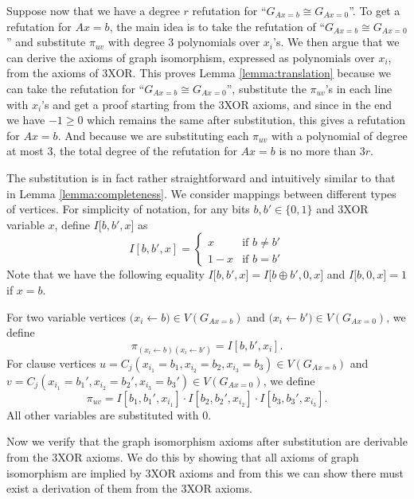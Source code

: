 \documentclass[a4paper,twoside,justified]{tufte-handout}
\begin{document}
Suppose now that we have a degree $r$ refutation for ``$G_{Ax=b} \cong G_{Ax=0}$''.
To get a refutation for $Ax=b$, the main idea is to take the refutation
of ``$G_{Ax=b} \cong G_{Ax=0}$'' and substitute $\pi_{uv}$ with
degree $3$
polynomials over $x_i$'s. We then argue that we can derive the axioms of
graph isomorphism, expressed as polynomials over $x_i$, 
from the axioms of 3XOR. This proves Lemma \ref{lemma:translation}
because we can take the refutation for ``$G_{Ax=b} \cong G_{Ax=0}$'', substitute the $\pi_{uv}$'s in each
line with $x_i$'s and get a proof starting from the 3XOR axioms, and since in the end we have $-1 \ge 0$
which remains the same after substitution, this gives a refutation for $Ax=b$. And because we are substituting
each $\pi_{uv}$ with a polynomial of degree at most 3, the total degree of the refutation for $Ax=b$ is no more than
$3r$.

The substitution is in fact rather straightforward and intuitively similar to that in Lemma \ref{lemma:completeness}. 
We consider mappings between different types of vertices. 
For simplicity of notation, for any bits $b,b' \in \{0,1\}$ and 3XOR variable $x$, define $I\bigl[b,b',x\bigr]$ as
\[
I\left[b,b',x\right] = 
\begin{cases}
  x &\text{if $b \neq b'$} \\
  1-x &\text{if $b = b'$}
\end{cases}
\]
Note that we have the following equality $I\bigl[b, b', x\bigr] = I\bigl[b \oplus b', 0, x\bigr]$ and $I\bigl[b, 0, x\bigr] = 1$ if $x = b$.

For two variable vertices
$\bigl(x_i \leftarrow b\bigr) \in V(G_{Ax=b})$ and 
$\bigl(x_i \leftarrow b'\bigr) \in V(G_{Ax=0})$, we define
\[
\pi_{(x_i \leftarrow b)(x_i \leftarrow b')} = I \left[ b, b', x_i \right].
\]
For clause vertices $u=C_j\left(x_{i_1}=b_1,x_{i_2}=b_2,x_{i_3}=b_3\right) \in V(G_{Ax=b})$ and
$v=C_j(x_{i_1}=b_1',x_{i_2}=b_2',x_{i_3}=b_3') \in V(G_{Ax=0})$, we define
\[
\pi_{uv} = I[b_1,b_1',x_{i_1}] \cdot I[b_2,b_2',x_{i_2}] \cdot I[b_3,b_3',x_{i_3}].
\]
All other variables are substituted with $0$.

Now we verify that the graph isomorphism axioms after substitution are derivable from the 3XOR axioms.
We do this by showing that all axioms of graph isomorphism are implied by 3XOR axioms and from
this we can show there must exist a derivation of them from the 3XOR axioms.
\end{document}
